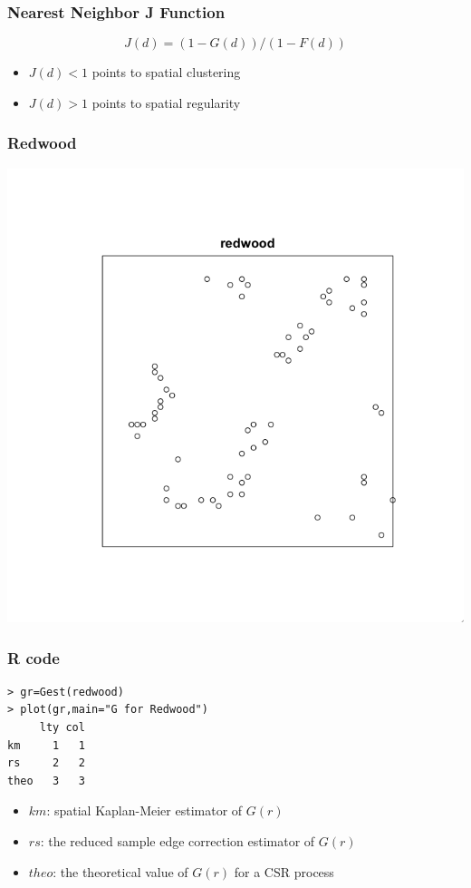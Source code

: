 \documentclass[nototal,handout]{beamer}
\begin{document}
\begin{frame}[<+->]
    \frametitle{Nearest Neighbor J Function}
    \begin{equation}
      J(d) = (1-G(d))/(1-F(d))
      \label{e:j}
    \end{equation}
    \begin{itemize}
      \item $J(d) < 1$ points to spatial clustering
      \item $J(d) > 1$ points to spatial regularity
    \end{itemize}
  \end{frame}

\begin{frame}[<+->]
    \frametitle{Redwood}
    \begin{center}
      \includegraphics[width=.65\linewidth]{redwood.png}
    \end{center}
  \end{frame}

  \begin{frame}[containsverbatim]
    \frametitle{R code}
    \begin{small}
      \begin{verbatim}
> gr=Gest(redwood)
> plot(gr,main="G for Redwood")
     lty col
km     1   1
rs     2   2
theo   3   3
      \end{verbatim}
      \begin{itemize}
	\item $km$: spatial Kaplan-Meier estimator of $G(r)$
	\item $rs$: the reduced sample edge correction estimator of $G(r)$
	\item $theo$: the theoretical value of $G(r)$ for a CSR process
      \end{itemize}
    \end{small}
   \end{frame}
\end{document}
